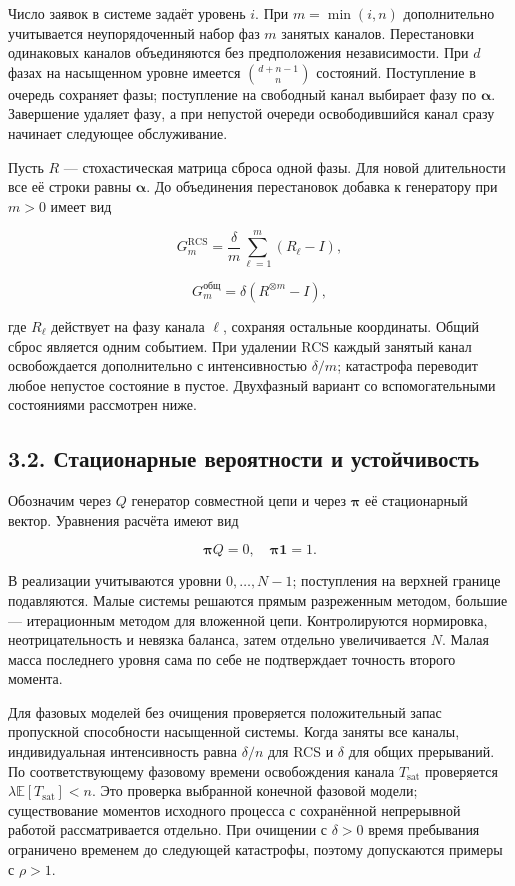 Число заявок в системе задаёт уровень \(i\). При \(m=\min(i,n)\) дополнительно учитывается неупорядоченный набор фаз \(m\) занятых каналов. Перестановки одинаковых каналов объединяются без предположения независимости. При \(d\) фазах на насыщенном уровне имеется \(\binom{d+n-1}{n}\) состояний. Поступление в очередь сохраняет фазы; поступление на свободный канал выбирает фазу по \(\boldsymbol\alpha\). Завершение удаляет фазу, а при непустой очереди освободившийся канал сразу начинает следующее обслуживание.

Пусть \(R\) --- стохастическая матрица сброса одной фазы. Для новой длительности все её строки равны \(\boldsymbol\alpha\). До объединения перестановок добавка к генератору при \(m>0\) имеет вид


\[G_m^{\mathrm{RCS}}=\frac{\delta}{m}\sum_{\ell=1}^{m}(R_\ell-I),\]

\[G_m^{\text{общ}}=\delta(R^{\otimes m}-I),\]


где \(R_\ell\) действует на фазу канала \(\ell\), сохраняя остальные координаты. Общий сброс является одним событием. При удалении RCS каждый занятый канал освобождается дополнительно с интенсивностью \(\delta/m\); катастрофа переводит любое непустое состояние в пустое. Двухфазный вариант со вспомогательными состояниями рассмотрен ниже.

\subsection*{3.2. Стационарные вероятности и устойчивость}
Обозначим через \(Q\) генератор совместной цепи и через \(\boldsymbol\pi\) её стационарный вектор. Уравнения расчёта имеют вид


\[\boldsymbol\pi Q=0,\quad \boldsymbol\pi\mathbf1=1.\]


В реализации учитываются уровни \(0,\ldots,N-1\); поступления на верхней границе подавляются. Малые системы решаются прямым разреженным методом, большие --- итерационным методом для вложенной цепи. Контролируются нормировка, неотрицательность и невязка баланса, затем отдельно увеличивается \(N\). Малая масса последнего уровня сама по себе не подтверждает точность второго момента.

Для фазовых моделей без очищения проверяется положительный запас пропускной способности насыщенной системы. Когда заняты все каналы, индивидуальная интенсивность равна \(\delta/n\) для RCS и \(\delta\) для общих прерываний. По соответствующему фазовому времени освобождения канала \(T_{\mathrm{sat}}\) проверяется \(\lambda\mathbb E[T_{\mathrm{sat}}]<n\). Это проверка выбранной конечной фазовой модели; существование моментов исходного процесса с сохранённой непрерывной работой рассматривается отдельно. При очищении с \(\delta>0\) время пребывания ограничено временем до следующей катастрофы, поэтому допускаются примеры с \(\rho>1\).

